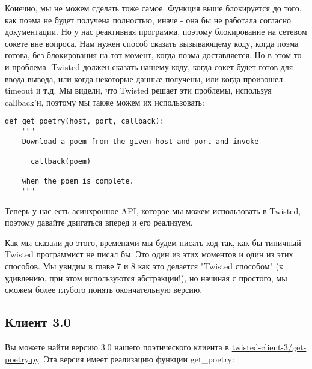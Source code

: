 Конечно, мы не можем сделать тоже самое. 
Функция выше блокируется до того, как поэма не 
будет получена полностью, иначе - она бы не работала 
согласно документации. Но у нас 
реактивная программа, поэтому блокирование на сетевом сокете 
вне вопроса. Нам нужен способ сказать вызывающему коду, 
когда поэма готова, без блокирования на тот момент, когда 
поэма доставляется. Но в этом то и проблема. 
Twisted должен сказать нашему коду, 
когда сокет будет готов для ввода-вывода, или когда 
некоторые данные получены, или когда произошел timeout и т.д. 
Мы видели, что Twisted решает эти проблемы, используя 
callback'и, поэтому мы также можем их использовать:

 \begin{verbatim}
def get_poetry(host, port, callback):
    """
    Download a poem from the given host and port and invoke

      callback(poem)

    when the poem is complete.
    """
\end{verbatim} 


Теперь у нас есть асинхронное API, которое мы можем использовать 
в Twisted, поэтому давайте двигаться вперед и его реализуем.


Как мы сказали до этого, временами мы будем писать код 
так, как бы типичный Twisted программист не писал бы. 
Это один из этих моментов и один из этих способов. Мы увидим в
главе 7 и 8 как это делается "Twisted способом" (к удивлению, 
при этом используются абстракции!), но начиная с простого, мы сможем 
более глубого понять окончательную версию.


\subsection{Клиент 3.0}

Вы можете найти версию 3.0 нашего поэтического 
клиента в 
\href{http://github.com/jdavisp3/twisted-intro/blob/master/twisted-client-3/get-poetry.py}{twisted-client-3/get-poetry.py}. 
Эта версия имеет реализацию функции get\_poetry:

